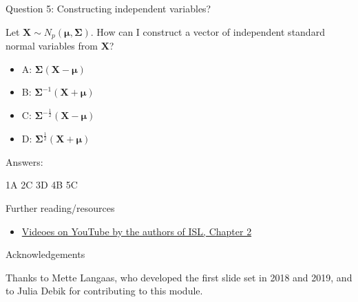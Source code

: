 \documentclass[ignorenonframetext,]{beamer}
\providecommand{\tightlist}{%
  \setlength{\itemsep}{0pt}\setlength{\parskip}{0pt}}
\begin{document}
\begin{frame}

\begin{block}{Question 5: Constructing independent variables?}

\vspace{2mm}

Let \(\mathbf{X}\sim N_p(\mathbf{\mu},\mathbf\Sigma)\). How can I
construct a vector of independent standard normal variables from
\(\mathbf{X}\)?

\begin{itemize}
\tightlist
\item
  A: \(\mathbf\Sigma(\mathbf{X}-\mathbf{\mu})\)
\item
  B: \(\mathbf\Sigma^{-1}(\mathbf{X}+\mathbf{\mu})\)
\item
  C: \(\mathbf\Sigma^{-\frac{1}{2}}(\mathbf{X}-\mathbf{\mu})\)
\item
  D: \(\mathbf\Sigma^{\frac{1}{2}}(\mathbf{X}+\mathbf{\mu})\)
\end{itemize}

\end{block}

\end{frame}

\begin{frame}

\begin{block}{Answers:}

1A 2C 3D 4B 5C

\end{block}

\end{frame}

\begin{frame}{ Further reading/resources}

\begin{itemize}
\tightlist
\item
  \href{https://www.youtube.com/playlist?list=PL5-da3qGB5IDvuFPNoSqheihPOQNJpzyy}{Videoes
  on YouTube by the authors of ISL, Chapter 2}
\end{itemize}

\end{frame}

\begin{frame}{Acknowledgements}

Thanks to Mette Langaas, who developed the first slide set in 2018 and
2019, and to Julia Debik for contributing to this module.

\end{frame}
\end{document}
